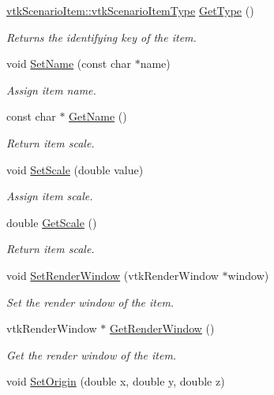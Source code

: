 \begin{DoxyCompactItemize}
\hyperlink{classvtkScenarioItem_a77bcdf6979a30db08fa7934f218994e0}{vtkScenarioItem::vtkScenarioItemType} \hyperlink{classvtkScenarioItem_ae0fec908b834864a99e2907e57c71081}{GetType} ()
\begin{DoxyCompactList}\small\item\em Returns the identifying key of the item. \item\end{DoxyCompactList}\item 
void \hyperlink{classvtkScenarioItem_a199f87511e99386bb9f271d91c2d0caf}{SetName} (const char $\ast$name)
\begin{DoxyCompactList}\small\item\em Assign item name. \item\end{DoxyCompactList}\item 
const char $\ast$ \hyperlink{classvtkScenarioItem_a41ebb204b2879d9dd14a392c1cb3c2fe}{GetName} ()
\begin{DoxyCompactList}\small\item\em Return item scale. \item\end{DoxyCompactList}\item 
void \hyperlink{classvtkScenarioItem_a4d199d1138fbfe835c36cd20efbedb1e}{SetScale} (double value)
\begin{DoxyCompactList}\small\item\em Assign item scale. \item\end{DoxyCompactList}\item 
double \hyperlink{classvtkScenarioItem_a136a346d222abe59fd63b2f4ced9b3fa}{GetScale} ()
\begin{DoxyCompactList}\small\item\em Return item scale. \item\end{DoxyCompactList}\item 
void \hyperlink{classvtkScenarioItem_a3ce404404d36c342b947f29fa02b6170}{SetRenderWindow} (vtkRenderWindow $\ast$window)
\begin{DoxyCompactList}\small\item\em Set the render window of the item. \item\end{DoxyCompactList}\item 
vtkRenderWindow $\ast$ \hyperlink{classvtkScenarioItem_a9d7908b11d2a477827342c05bb505e66}{GetRenderWindow} ()
\begin{DoxyCompactList}\small\item\em Get the render window of the item. \item\end{DoxyCompactList}\item 
\hypertarget{classvtkScenarioItem_aaf1b9a0bbce0602583bd37a9d3817c75}{
void \hyperlink{classvtkScenarioItem_aaf1b9a0bbce0602583bd37a9d3817c75}{SetOrigin} (double x, double y, double z)}
\label{classvtkScenarioItem_aaf1b9a0bbce0602583bd37a9d3817c75}


\end{DoxyCompactItemize}

